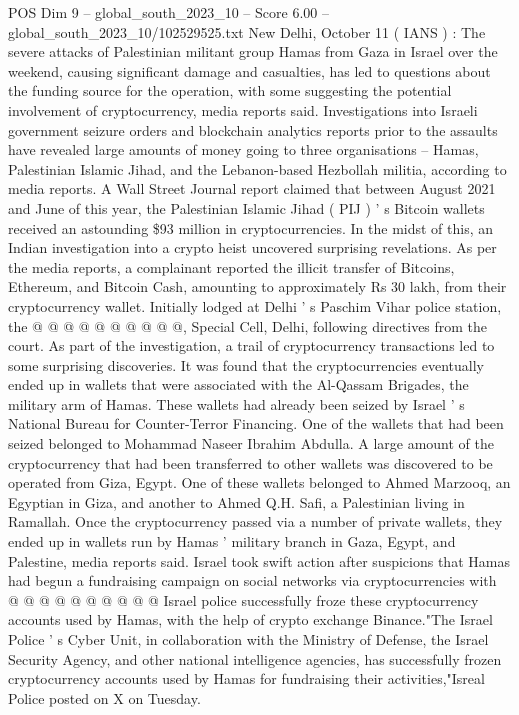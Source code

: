 \begin{textsample}{POS Dim 9 – global\_south\_2023\_10 – Score 6.00 – global\_south\_2023\_10/102529525.txt}  \label{ex:f9_pos_034}
New Delhi, October 11 ( IANS ) : The severe attacks of Palestinian militant group Hamas from Gaza in Israel over the weekend, causing significant damage and casualties, has led to questions about the funding source for the operation, with some suggesting the potential involvement of cryptocurrency, media reports said.
Investigations into Israeli government seizure orders and blockchain analytics reports prior to the assaults have revealed large amounts of money going to three organisations -- Hamas, Palestinian Islamic Jihad, and the Lebanon-based Hezbollah militia, according to media reports.
A Wall Street Journal report claimed that between August 2021 and June of this year, the Palestinian Islamic Jihad ( PIJ ) ' s Bitcoin wallets received an astounding \$93 million in cryptocurrencies.
In the midst of this, an Indian investigation into a crypto heist uncovered surprising revelations.
As per the media reports, a complainant reported the illicit transfer of Bitcoins, Ethereum, and Bitcoin Cash, amounting to approximately Rs 30 lakh, from their cryptocurrency wallet.
Initially lodged at Delhi ' s Paschim Vihar police station, the @ @ @ @ @ @ @ @ @ @, Special Cell, Delhi, following directives from the court.
As part of the investigation, a trail of cryptocurrency transactions led to some surprising discoveries.
It was found that the cryptocurrencies eventually ended up in wallets that were associated with the Al-Qassam Brigades, the military arm of Hamas.
These wallets had already been seized by Israel ' s National Bureau for Counter-Terror Financing.
One of the wallets that had been seized belonged to Mohammad Naseer Ibrahim Abdulla.
A large amount of the cryptocurrency that had been transferred to other wallets was discovered to be operated from Giza, Egypt.
One of these wallets belonged to Ahmed Marzooq, an Egyptian in Giza, and another to Ahmed Q.H.
Safi, a Palestinian living in Ramallah.
Once the cryptocurrency passed via a number of private wallets, they ended up in wallets run by Hamas ' military branch in Gaza, Egypt, and Palestine, media reports said.
Israel took swift action after suspicions that Hamas had begun a fundraising campaign on social networks via cryptocurrencies with @ @ @ @ @ @ @ @ @ @ Israel police successfully froze these cryptocurrency accounts used by Hamas, with the help of crypto exchange Binance."The Israel Police ' s Cyber Unit, in collaboration with the Ministry of Defense, the Israel Security Agency, and other national intelligence agencies, has successfully frozen cryptocurrency accounts used by Hamas for fundraising their activities,"Isreal Police posted on X on Tuesday.

\end{textsample}
